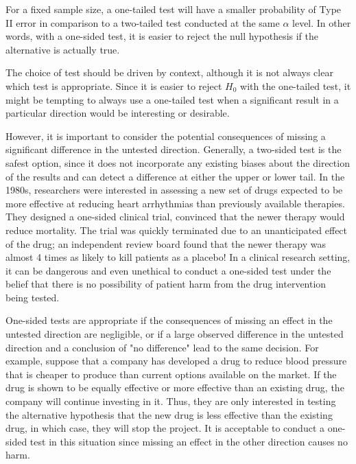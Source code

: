 \textD{\newpage}

For a fixed sample size, a one-tailed test will have a smaller probability of Type II error in comparison to a two-tailed test conducted at the same $\alpha$ level. In other words, with a one-sided test, it is easier to reject the null hypothesis if the alternative is actually true. 

The choice of test should be driven by context, although it is not always clear which test is appropriate. Since it is easier to reject $H_0$ with the one-tailed test, it might be tempting to always use a one-tailed test when a significant result in a particular direction would be interesting or desirable. 

However, it is important to consider the potential consequences of missing a significant difference in the untested direction. Generally, a two-sided test is the safest option, since it does not incorporate any existing biases about the direction of the results and can detect a difference at either the upper or lower tail. In the 1980s, researchers were interested in assessing a new set of drugs expected to be more effective at reducing heart arrhythmias than previously available therapies. They designed a one-sided clinical trial, convinced that the newer therapy would reduce mortality. The trial was quickly terminated due to an unanticipated effect of the drug; an independent review board found that the newer therapy was almost 4 times as likely to kill patients as a placebo! In a clinical research setting, it can be dangerous and even unethical to conduct a one-sided test under the belief that there is no possibility of patient harm from the drug intervention being tested.


One-sided tests are appropriate if the consequences of missing an effect in the untested direction are negligible, or if a large observed difference in the untested direction and a conclusion of "no difference" lead to the same decision. For example, suppose that a company has developed a drug to reduce blood pressure that is cheaper to produce than current options available on the market. If the drug is shown to be equally effective or more effective than an existing drug, the company will continue investing in it. Thus, they are only interested in testing the alternative hypothesis that the new drug is less effective than the existing drug, in which case, they will stop the project. It is acceptable to conduct a one-sided test in this situation since missing an effect in the other direction causes no harm. 

